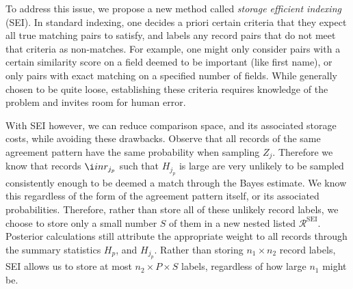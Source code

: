 \documentclass[12pt,letterpaper]{article}
\newcommand{\1}[1]{\mathbb{I}\!\left[#1\right]} %
\begin{document}

To address this issue, we propose a new method called \emph{storage	efficient indexing} (SEI). In standard indexing, one decides a priori certain criteria that they expect all true matching pairs to satisfy, 
and labels any record pairs that do not meet that criteria as
non-matches. For example, one might only consider pairs with a certain
similarity score on a field deemed to be important (like first name), or
only pairs with exact matching on a specified number of fields. While
generally chosen to be quite loose, establishing these criteria
requires knowledge of the problem and invites room for human error. 


With SEI however, we can reduce comparison space, and its associated storage costs, while avoiding these drawbacks. Observe that all records of the same agreement pattern have the same probability when sampling \(Z_j\). Therefore we know that records $\i in r_{j_p}$  such that
\(H_{j_p}\) is large are very unlikely to be sampled consistently enough
to be deemed a match through the Bayes estimate. We know this regardless of the form of the agreement pattern itself, or its associated probabilities. Therefore, rather than store all of these unlikely record labels, we choose to store only a small number \(S\) of them in a new nested listed $\mathcal{R}^{\text{SEI}}$. Posterior calculations still attribute the appropriate weight to all records through the summary statistics \(H_p\), and \(H_{j_p}\). Rather than storing
\(n_1 \times n_2\) record labels, SEI allows us to store at most
\(n_2 \times P \times S\) labels, regardless of how large \(n_1\) might be.
\end{document}
